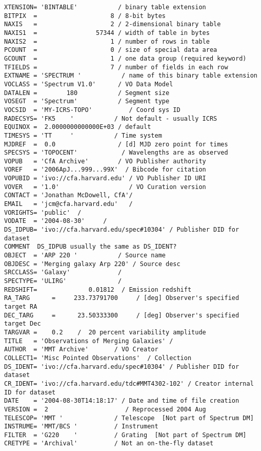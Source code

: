{  \footnotesize
\begin{verbatim}
XTENSION= 'BINTABLE'           / binary table extension
BITPIX  =                    8 / 8-bit bytes
NAXIS   =                    2 / 2-dimensional binary table
NAXIS1  =                57344 / width of table in bytes
NAXIS2  =                    1 / number of rows in table
PCOUNT  =                    0 / size of special data area
GCOUNT  =                    1 / one data group (required keyword)
TFIELDS =                    7 / number of fields in each row
EXTNAME = 'SPECTRUM '           / name of this binary table extension
VOCLASS = 'Spectrum V1.0'      / VO Data Model
DATALEN =        180           / Segment size
VOSEGT  = 'Spectrum'           / Segment type
VOCSID  = 'MY-ICRS-TOPO'          / Coord sys ID
RADECSYS= 'FK5    '           / Not default - usually ICRS
EQUINOX =  2.0000000000000E+03 / default
TIMESYS = 'TT     '           / Time system
MJDREF  =  0.0                 / [d] MJD zero point for times
SPECSYS = 'TOPOCENT'            / Wavelengths are as observed
VOPUB   = 'CfA Archive'        / VO Publisher authority
VOREF   = '2006ApJ...999...99X'  / Bibcode for citation
VOPUBID = 'ivo://cfa.harvard.edu' / VO Publisher ID URI
VOVER   = '1.0'                   / VO Curation version
CONTACT = 'Jonathan McDowell, CfA'/
EMAIL   = 'jcm@cfa.harvard.edu'   /
VORIGHTS= 'public'  /
VODATE  = '2004-08-30'     /
DS_IDPUB= 'ivo://cfa.harvard.edu/spec#10304' / Publisher DID for dataset
COMMENT  DS_IDPUB usually the same as DS_IDENT?
OBJECT  = 'ARP 220 '           / Source name
OBJDESC = 'Merging galaxy Arp 220' / Source desc
SRCCLASS= 'Galaxy'             /
SPECTYPE= 'ULIRG'              /
REDSHIFT=              0.01812  / Emission redshift
RA_TARG      =     233.73791700     / [deg] Observer's specified target RA
DEC_TARG     =      23.50333300     / [deg] Observer's specified target Dec
TARGVAR =    0.2    /  20 percent variability amplitude
TITLE   = 'Observations of Merging Galaxies' /
AUTHOR  = 'MMT Archive'       / VO Creator
COLLECT1= 'Misc Pointed Observations'  / Collection
DS_IDENT= 'ivo://cfa.harvard.edu/spec#10304' / Publisher DID for dataset
CR_IDENT= 'ivo://cfa.harvard.edu/tdc#MMT4302-102' / Creator internal ID for dataset
DATE    = '2004-08-30T14:18:17' / Date and time of file creation
VERSION =  2                     / Reprocessed 2004 Aug
TELESCOP= 'MMT '              / Telescope  [Not part of Spectrum DM]
INSTRUME= 'MMT/BCS '          / Instrument
FILTER  = 'G220    '          / Grating  [Not part of Spectrum DM]
CRETYPE = 'Archival'          / Not an on-the-fly dataset

\end{verbatim}}
